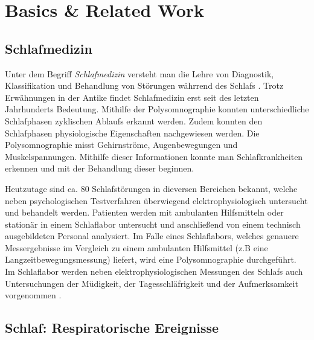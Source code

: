 
\chapter{Basics \& Related Work}
\label{ch:Basics}

\section{Schlafmedizin}
\label{ch:Basics:se:schlafmedizin}
Unter dem Begriff \textit{Schlafmedizin} versteht man die Lehre von Diagnostik, Klassifikation und Behandlung von Störungen währrend des Schlafs \cite{schlafmedizin_1x1}. 
Trotz Erwähnungen in der Antike findet Schlafmedizin erst seit des letzten Jahrhunderts Bedeutung.
Mithilfe der Polysomnographie konnten unterschiedliche Schlafphasen zyklischen Ablaufs erkannt werden.
Zudem konnten den Schlafphasen physiologische Eigenschaften nachgewiesen werden.
Die Polysomnographie misst Gehirnströme, Augenbewegungen und Muskelspannungen.
Mithilfe dieser Informationen konnte man Schlafkrankheiten erkennen und mit der Behandlung dieser beginnen.


Heutzutage sind ca. 80 Schlafstörungen in dieversen Bereichen bekannt, welche neben psychologischen Testverfahren überwiegend elektrophysiologisch untersucht und behandelt werden.
Patienten werden mit ambulanten Hilfsmitteln oder stationär in einem Schlaflabor untersucht und anschließend von einem technisch ausgebildeten Personal analysiert.
Im Falle eines Schlaflabors, welches genauere Messergebnisse im Vergleich zu einem ambulanten Hilfsmittel (z.B eine Langzeitbewegungsmessung) liefert, wird eine Polysomnographie durchgeführt.
Im Schlaflabor werden neben elektrophysiologischen Messungen des Schlafs auch Untersuchungen der Müdigkeit, der Tagesschläfrigkeit und der Aufmerksamkeit vorgenommen \cite{schlafmedizin_1x1}.


\section{Schlaf: Respiratorische Ereignisse}


